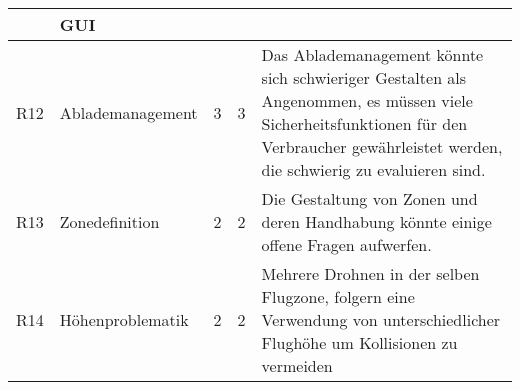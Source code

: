 \begin{longtable}{llccX}
\midrule
	& \textbf{GUI} &  & & \\
\midrule
R12 & Ablademanagement & 3 & 3 & Das Ablademanagement könnte sich schwieriger Gestalten als Angenommen, es müssen viele Sicherheitsfunktionen für den Verbraucher gewährleistet werden, die schwierig zu evaluieren sind. \\
R13 & Zonedefinition & 2 & 2 & Die Gestaltung von Zonen und deren Handhabung könnte einige offene Fragen aufwerfen. \\
R14 & Höhenproblematik & 2 & 2 & Mehrere Drohnen in der selben Flugzone, folgern eine Verwendung von unterschiedlicher Flughöhe um Kollisionen zu vermeiden \\

\bottomrule
\end{longtable}